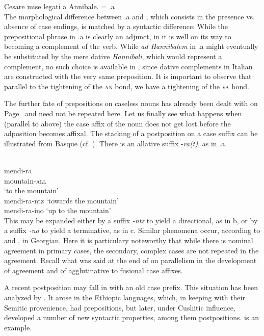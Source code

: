 \ea\label{ex:E73}
    Cesare mise legati a Annibale.  = .a\\
\z
\noindent The morphological difference between .a and , which consists in the presence vs. absence of case endings, is matched by a syntactic difference: While the prepositional phrase in .a is clearly an adjunct, in  it is well on its way to becoming a complement of the verb.\label{page100} While \textit{ad Hannibalem} in .a might eventually be substituted by the mere dative \textit{Hannibali}, which would represent a complement, no such choice is available in , since dative complements in Italian are constructed with the very same preposition. It is important to observe that parallel to the tightening of the \textsc{an} bond, we have a tightening of the \textsc{va} bond.

The further fate of prepositions on caseless nouns has already been dealt with on Page~\pageref{page88}\chk%
and need not be repeated here. Let us finally see what happens when (parallel to  above) the case affix of the noun does not get lost before the adposition becomes affixal. The stacking of a postposition on a case suffix can be illustrated from Basque (cf. \citet[69]{Brettschneider1978}). There is an allative suffix -\textit{ra(t)}, as in .a.

\ea\label{ex:E74}
 \\
\ea
\gll mendi-ra\\
mountain-\textsc{all} \\
\glt ‘to the mountain’\\
\ex  mendi-ra-ntz 
\glt ‘towards the mountain’\\
\ex  mendi-ra-ino 
\glt ‘up to the mountain’\\
\z
\z
\noindent This may be expanded either by a suffix \textit{{}-ntz} to yield a directional, as in b, or by a suffix \textit{{}-no} to yield a terminative, as in c. Similar phenomena occur, according to \citet[123f]{Kahr1976} and \citet[210f]{Comrie1981a},\label{page101} in Georgian. Here it is particulary noteworthy that while there is nominal agreement in primary cases, the secondary, complex cases are not repeated in the agreement. Recall what was said at the end of  on parallelism in the development of agreement and of agglutinative to fusional case affixes.

A recent postposition may fall in with an old case prefix. This situation has been analyzed by \citet{Greenberg1980}. It arose in the Ethiopic languages, which, in keeping with their Semitic provenience, had prepositions, but later, under Cushitic influence, developed a number of new syntactic properties, among them postpositions.  is an example.


